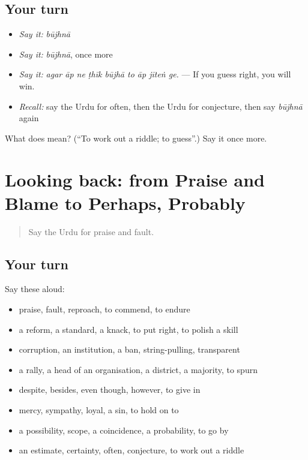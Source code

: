 \subsection*{Your turn}
\begin{itemize}
\raggedright
  \item \emph{Say it:} \emph{būjhnā}
  \item \emph{Say it:} \emph{būjhnā}, once more
  \item \emph{Say it:} \emph{agar āp ne ṭhīk būjhā to āp jīteṅ ge.} — If you guess right, you will win.
  \item \emph{Recall:} say the Urdu for often, then the Urdu for conjecture, then say \emph{būjhnā} again
\end{itemize}

\begin{tcolorbox}[breakable,colback=teal!4,colframe=teal!35!black,title={Before you move on}]
What does  mean? (\textquotedblleft{}To work out a riddle; to guess\textquotedblright{}.) Say it once more.
\end{tcolorbox}
\section[(dialogue)]{Looking back: from Praise and Blame to Perhaps, Probably}

\label{lesson:UR-R362-review-355-362}



\begin{quote}
Say the Urdu for praise and fault.
\end{quote}

\subsection*{Your turn}
Say these aloud:

\begin{itemize}
\raggedright
  \item praise, fault, reproach, to commend, to endure
  \item a reform, a standard, a knack, to put right, to polish a skill
  \item corruption, an institution, a ban, string-pulling, transparent
  \item a rally, a head of an organisation, a district, a majority, to spurn
  \item despite, besides, even though, however, to give in
  \item mercy, sympathy, loyal, a sin, to hold on to
  \item a possibility, scope, a coincidence, a probability, to go by
  \item an estimate, certainty, often, conjecture, to work out a riddle
\end{itemize}

